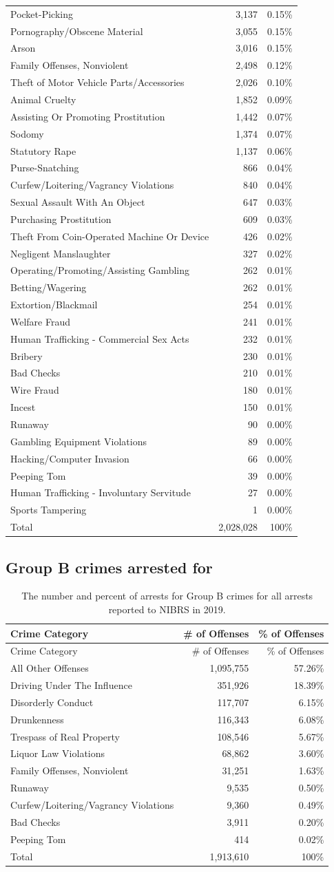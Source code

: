 \documentclass[
  12pt,
  openany]{book}
\begin{document}
\begin{longtable}[]{@{}lrr@{}}
Pocket-Picking & 3,137 & 0.15\%\tabularnewline
Pornography/Obscene Material & 3,055 & 0.15\%\tabularnewline
Arson & 3,016 & 0.15\%\tabularnewline
Family Offenses, Nonviolent & 2,498 & 0.12\%\tabularnewline
Theft of Motor Vehicle Parts/Accessories & 2,026 & 0.10\%\tabularnewline
Animal Cruelty & 1,852 & 0.09\%\tabularnewline
Assisting Or Promoting Prostitution & 1,442 & 0.07\%\tabularnewline
Sodomy & 1,374 & 0.07\%\tabularnewline
Statutory Rape & 1,137 & 0.06\%\tabularnewline
Purse-Snatching & 866 & 0.04\%\tabularnewline
Curfew/Loitering/Vagrancy Violations & 840 & 0.04\%\tabularnewline
Sexual Assault With An Object & 647 & 0.03\%\tabularnewline
Purchasing Prostitution & 609 & 0.03\%\tabularnewline
Theft From Coin-Operated Machine Or Device & 426 & 0.02\%\tabularnewline
Negligent Manslaughter & 327 & 0.02\%\tabularnewline
Operating/Promoting/Assisting Gambling & 262 & 0.01\%\tabularnewline
Betting/Wagering & 262 & 0.01\%\tabularnewline
Extortion/Blackmail & 254 & 0.01\%\tabularnewline
Welfare Fraud & 241 & 0.01\%\tabularnewline
Human Trafficking - Commercial Sex Acts & 232 & 0.01\%\tabularnewline
Bribery & 230 & 0.01\%\tabularnewline
Bad Checks & 210 & 0.01\%\tabularnewline
Wire Fraud & 180 & 0.01\%\tabularnewline
Incest & 150 & 0.01\%\tabularnewline
Runaway & 90 & 0.00\%\tabularnewline
Gambling Equipment Violations & 89 & 0.00\%\tabularnewline
Hacking/Computer Invasion & 66 & 0.00\%\tabularnewline
Peeping Tom & 39 & 0.00\%\tabularnewline
Human Trafficking - Involuntary Servitude & 27 & 0.00\%\tabularnewline
Sports Tampering & 1 & 0.00\%\tabularnewline
Total & 2,028,028 & 100\%\tabularnewline
\bottomrule
\end{longtable}

\hypertarget{group-b-crimes-arrested-for}{%
\subsection{Group B crimes arrested for}\label{group-b-crimes-arrested-for}}

\begin{longtable}[]{@{}lrr@{}}
\caption{\label{tab:GroupBarresteeCrime}The number and percent of arrests for Group B crimes for all arrests reported to NIBRS in 2019.}\tabularnewline
\toprule
Crime Category & \# of Offenses & \% of Offenses\tabularnewline
\midrule
\endfirsthead
\toprule
Crime Category & \# of Offenses & \% of Offenses\tabularnewline
\midrule
\endhead
All Other Offenses & 1,095,755 & 57.26\%\tabularnewline
Driving Under The Influence & 351,926 & 18.39\%\tabularnewline
Disorderly Conduct & 117,707 & 6.15\%\tabularnewline
Drunkenness & 116,343 & 6.08\%\tabularnewline
Trespass of Real Property & 108,546 & 5.67\%\tabularnewline
Liquor Law Violations & 68,862 & 3.60\%\tabularnewline
Family Offenses, Nonviolent & 31,251 & 1.63\%\tabularnewline
Runaway & 9,535 & 0.50\%\tabularnewline
Curfew/Loitering/Vagrancy Violations & 9,360 & 0.49\%\tabularnewline
Bad Checks & 3,911 & 0.20\%\tabularnewline
Peeping Tom & 414 & 0.02\%\tabularnewline
Total & 1,913,610 & 100\%\tabularnewline
\bottomrule
\end{longtable}
\end{document}
